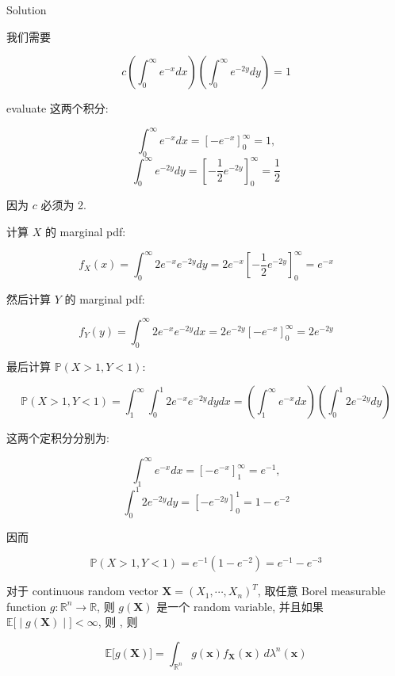 \documentclass{qlnotes-export}
\begin{document}
\begin{qlsolution}{Solution}

我们需要

\[c\left( {\int_{0}^{\infty}e^{- x}dx} \right)\left( {\int_{0}^{\infty}e^{- 2y}dy} \right) = 1\]

evaluate 这两个积分:

\[\int_{0}^{\infty}e^{- x}dx = \left\lbrack {- e^{- x}} \right\rbrack_{0}^{\infty} = 1,\]\[\int_{0}^{\infty}e^{- 2y}dy = \left\lbrack {- \frac{1}{2}e^{- 2y}} \right\rbrack_{0}^{\infty} = \frac{1}{2}\]

因为 \(c\) 必须为 2.

计算 \(X\) 的 marginal pdf:

\[f_{X}(x) = \int_{0}^{\infty}2e^{- x}e^{- 2y}dy = 2e^{- x}\left\lbrack {- \frac{1}{2}e^{- 2y}} \right\rbrack_{0}^{\infty} = e^{- x}\]

然后计算 \(Y\) 的 marginal pdf:

\[f_{Y}(y) = \int_{0}^{\infty}2e^{- x}e^{- 2y}dx = 2e^{- 2y}\left\lbrack {- e^{- x}} \right\rbrack_{0}^{\infty} = 2e^{- 2y}\]

最后计算 \({\mathbb{P}}(X > 1,Y < 1)\):

\[{\mathbb{P}}(X > 1,Y < 1) = \int_{1}^{\infty}\int_{0}^{1}2e^{- x}e^{- 2y}dydx = \left( {\int_{1}^{\infty}e^{- x}dx} \right)\left( {\int_{0}^{1}2e^{- 2y}dy} \right)\]

这两个定积分分别为:

\[\int_{1}^{\infty}e^{- x}dx = \left\lbrack {- e^{- x}} \right\rbrack_{1}^{\infty} = e^{- 1},\]\[\int_{0}^{1}2e^{- 2y}dy = \left\lbrack {- e^{- 2y}} \right\rbrack_{0}^{1} = 1 - e^{- 2}\]

因而

\[{\mathbb{P}}(X > 1,Y < 1) = e^{- 1}(1 - e^{- 2}) = e^{- 1} - e^{- 3}\]

\end{qlsolution}

\begin{theorem}

对于 continuous random vector \(\mathbf{X} = (X_{1},\cdots,X_{n})^{T}\), 取任意 Borel measurable function \(g:{\mathbb{R}}^{n}\rightarrow{\mathbb{R}}\), 则 \(g(\mathbf{X})\) 是一个 random variable, 并且如果 \(\left. {\mathbb{E}}\lbrack \middle| g(\mathbf{X}) \middle| \rbrack < \infty \right.\), 则 , 则

\[{\mathbb{E}}\lbrack g(\mathbf{X})\rbrack = \int_{{\mathbb{R}}^{n}}g(\mathbf{x})f_{\mathbf{X}}(\mathbf{x})\, d\lambda^{n}(\mathbf{x})\]

\end{theorem}
\end{document}
